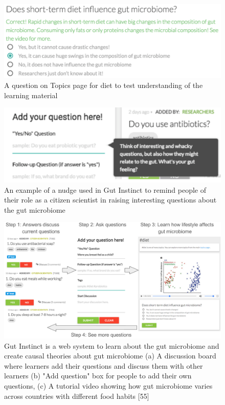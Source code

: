 \begin{figure}[h] 
  \centering
  \includegraphics[width=1.0\textwidth]{figures/gutinstinct/gi-3.png}
  \caption[]
{A question on Topics page for diet to test understanding of the learning material }
  \label{fig:gi-3}
\end{figure}

\begin{figure}[h] 
  \centering
  \includegraphics[width=1.0\textwidth]{figures/gutinstinct/gi-4.png}
  \caption[]
{An example of a nudge used in Gut Instinct to remind people of their role as a citizen scientist in raising interesting questions about the gut microbiome }
  \label{fig:gi-4}
\end{figure}

\begin{figure}[h] 
  \centering
  \includegraphics[width=1.0\textwidth]{figures/gutinstinct/gi-5.png}
  \caption[]
{ Gut Instinct is a web system to learn about the gut microbiome and create causal theories about gut microbiome (a) A discussion board where learners add their questions and discuss them with other learners (b) "Add question" box for people to add their own questions, (c) A tutorial video showing how gut microbiome varies across countries with different food habits [55]}
  \label{fig:gi-5}
\end{figure}

